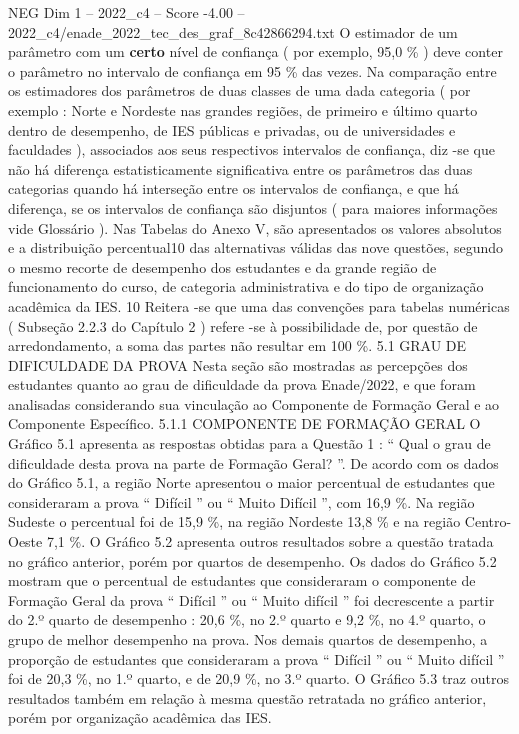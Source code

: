 \begin{textsample}{NEG Dim 1 – 2022\_c4 – Score -4.00 – 2022\_c4/enade\_2022\_tec\_des\_graf\_8c42866294.txt}
O estimador de um parâmetro com um \textbf{certo} nível de confiança ( por exemplo, 95,0 \% ) deve conter o parâmetro no intervalo de confiança em 95 \% das vezes.
Na comparação entre os estimadores dos parâmetros de duas classes de uma dada categoria ( por exemplo : Norte e Nordeste nas grandes regiões, de primeiro e último quarto dentro de desempenho, de IES públicas e privadas, ou de universidades e faculdades ), associados aos seus respectivos intervalos de confiança, diz -se que não há diferença estatisticamente significativa entre os parâmetros das duas categorias quando há interseção entre os intervalos de confiança, e que há diferença, se os intervalos de confiança são disjuntos ( para maiores informações vide Glossário ).
Nas Tabelas do Anexo V, são apresentados os valores absolutos e a distribuição percentual10 das alternativas válidas das nove questões, segundo o mesmo recorte de desempenho dos estudantes e da grande região de funcionamento do curso, de categoria administrativa e do tipo de organização acadêmica da IES. 10 Reitera -se que uma das convenções para tabelas numéricas ( Subseção 2.2.3 do Capítulo 2 ) refere -se à possibilidade de, por questão de arredondamento, a soma das partes não resultar em 100 \%. 5.1 GRAU DE DIFICULDADE DA PROVA Nesta seção são mostradas as percepções dos estudantes quanto ao grau de dificuldade da prova Enade/2022, e que foram analisadas considerando sua vinculação ao Componente de Formação Geral e ao Componente Específico. 5.1.1 COMPONENTE DE FORMAÇÃO GERAL O Gráfico 5.1 apresenta as respostas obtidas para a Questão 1 : “ Qual o grau de dificuldade desta prova na parte de Formação Geral? ”.
De acordo com os dados do Gráfico 5.1, a região Norte apresentou o maior percentual de estudantes que consideraram a prova “ Difícil ” ou “ Muito Difícil ”, com 16,9 \%.
Na região Sudeste o percentual foi de 15,9 \%, na região Nordeste 13,8 \% e na região Centro-Oeste 7,1 \%.
O Gráfico 5.2 apresenta outros resultados sobre a questão tratada no gráfico anterior, porém por quartos de desempenho.
Os dados do Gráfico 5.2 mostram que o percentual de estudantes que consideraram o componente de Formação Geral da prova “ Difícil ” ou “ Muito difícil ” foi decrescente a partir do 2.º quarto de desempenho : 20,6 \%, no 2.º quarto e 9,2 \%, no 4.º quarto, o grupo de melhor desempenho na prova.
Nos demais quartos de desempenho, a proporção de estudantes que consideraram a prova “ Difícil ” ou “ Muito difícil ” foi de 20,3 \%, no 1.º quarto, e de 20,9 \%, no 3.º quarto.
O Gráfico 5.3 traz outros resultados também em relação à mesma questão retratada no gráfico anterior, porém por organização acadêmica das IES.

\end{textsample}
